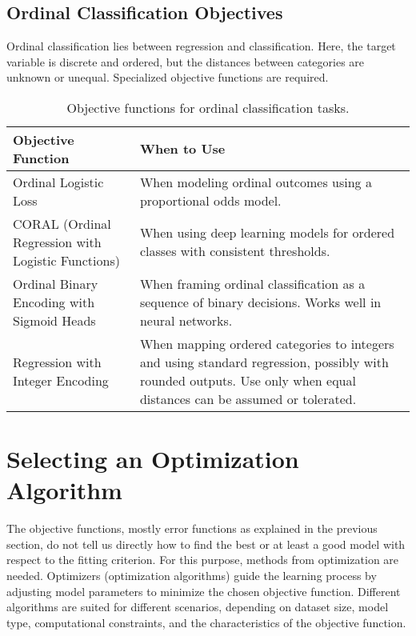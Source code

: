 \documentclass[12pt,openany]{book}
\begin{document}
\subsection{Ordinal Classification Objectives}

Ordinal classification lies between regression and classification. 
Here, the target variable is discrete and ordered, but the distances 
between categories are unknown or unequal. Specialized objective 
functions are required.

\begin{table}[H]
    \centering
    \small
    \renewcommand{\arraystretch}{1.3}
    \begin{tabular}{|l|p{9cm}|}
        \hline
        \textbf{Objective Function} & \textbf{When to Use} \\
        \hline
        Ordinal Logistic Loss & When modeling ordinal outcomes using a proportional odds model. \\
        \hline
        CORAL (Ordinal Regression with Logistic Functions) & When using deep learning models for ordered classes with consistent thresholds. \\
        \hline
        Ordinal Binary Encoding with Sigmoid Heads & When framing ordinal classification as a sequence of binary decisions. Works well in neural networks. \\
        \hline
        Regression with Integer Encoding & When mapping ordered categories to integers and using standard regression, possibly with rounded outputs. Use only when equal distances can be assumed or tolerated. \\
        \hline
    \end{tabular}
    \caption{Objective functions for ordinal classification tasks.}
\end{table}




\section{Selecting an Optimization Algorithm}

The objective functions, mostly error functions as explained in the previous section, do not tell us directly how to find the best or at least a good model with respect to the fitting criterion. For this purpose, methods from optimization are needed. Optimizers (optimization algorithms) guide the learning process by adjusting model parameters to minimize the chosen objective function. Different algorithms are suited for different scenarios, depending on dataset size, model type, computational constraints, and the characteristics of the objective function.
\newline
\end{document}
